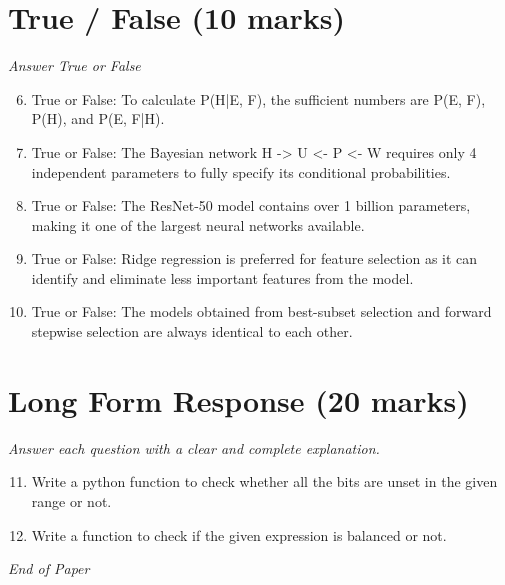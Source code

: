 \documentclass[12pt]{article}
\begin{document}
\section*{True / False (10 marks)}
\textit{Answer True or False}
\begin{enumerate}[label=\arabic*.]
\setcounter{enumi}{5}
\item True or False: To calculate P(H|E, F), the sufficient numbers are P(E, F), P(H), and P(E, F|H).
\item True or False: The Bayesian network H -\textgreater{} U \textless{}- P \textless{}- W requires only 4 independent parameters to fully specify its conditional probabilities.
\item True or False: The ResNet-50 model contains over 1 billion parameters, making it one of the largest neural networks available.
\item True or False: Ridge regression is preferred for feature selection as it can identify and eliminate less important features from the model.
\item True or False: The models obtained from best-subset selection and forward stepwise selection are always identical to each other.
\end{enumerate}

\section*{Long Form Response (20 marks)}
\textit{Answer each question with a clear and complete explanation.}
\begin{enumerate}[label=\arabic*.]
\setcounter{enumi}{10}
\item Write a python function to check whether all the bits are unset in the given range or not.
\item Write a function to check if the given expression is balanced or not.
\end{enumerate}

\vfill
\noindent\textit{End of Paper}
\end{document}
